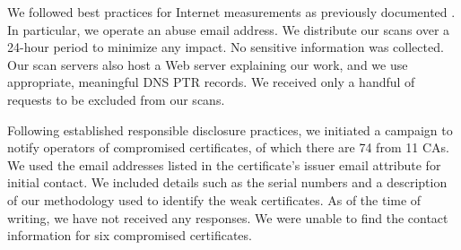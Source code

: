 We followed best practices for Internet measurements as previously documented \cite{ZMapInternetScanner2023}. In particular, we operate an abuse email address. We distribute our scans over a 24-hour period to minimize any impact. No sensitive information was collected. Our scan servers also host a Web server explaining our work, and we use appropriate, meaningful DNS PTR records. We received only a handful of requests to be excluded from our scans.

Following established responsible disclosure practices, we initiated a campaign to notify operators of compromised certificates, of which there are 74 from 11 \glspl{CA}. We used the email addresses listed in the certificate's issuer email attribute for initial contact. We included details such as the serial numbers and a description of our methodology used to identify the weak certificates. As of the time of writing, we have not received any responses. We were unable to find the contact information for six compromised certificates.